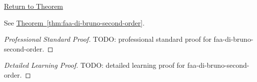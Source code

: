 \newpage
{}
\label{prf:faa-di-bruno-second-order}

\begin{remark*}[Return]
\hyperref[thm:faa-di-bruno-second-order]{Return to Theorem}
\end{remark*}

\begin{theorem*}
See \hyperref[thm:faa-di-bruno-second-order]{Theorem~\ref*{thm:faa-di-bruno-second-order}}.
\end{theorem*}

\begin{proof}[Professional Standard Proof]
\LRAProofBodyStart
TODO: professional standard proof for faa-di-bruno-second-order.
\end{proof}

\begin{proof}[Detailed Learning Proof]
\LRAProofBodyStart
TODO: detailed learning proof for faa-di-bruno-second-order.
\end{proof}

\begin{remark*}
\end{remark*}

\begin{dependencies}
\NoLocalDependencies
\end{dependencies}

\clearpage
